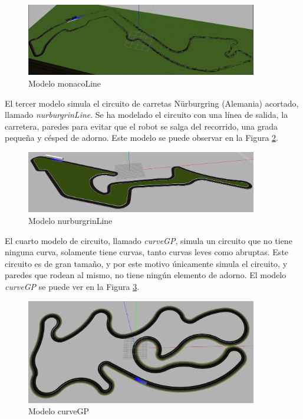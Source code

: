 \begin{figure}
  \begin{center}
    \includegraphics[width=0.9\textwidth]{figures/Infraestructura/circuit_Monaco.png}
		\caption{Modelo monacoLine}
		\label{fig.monaco}
		\end{center}
\end{figure}

El tercer modelo simula el circuito de carretas Nürburgring (Alemania) acortado, llamado \textit{nurburgrinLine}. Se ha modelado el circuito con una línea de salida, la carretera, paredes para evitar que el robot se salga del recorrido, una grada pequeña y césped de adorno. Este modelo se puede observar en la Figura \ref{fig.nurburgrin}.\\

\begin{figure}
  \begin{center}
    \includegraphics[width=0.9\textwidth]{figures/Infraestructura/circuit_Nurburgrin.png}
		\caption{Modelo nurburgrinLine}
		\label{fig.nurburgrin}
		\end{center}
\end{figure}

El cuarto modelo de circuito, llamado \textit{curveGP}, simula un circuito que no tiene ninguna curva, solamente tiene curvas, tanto curvas leves como abruptas. Este circuito es de gran tamaño, y por este motivo únicamente simula el circuito, y paredes que rodean al mismo, no tiene ningún elemento de adorno. El modelo \textit{curveGP} se puede ver en la Figura \ref{fig.curveGP}.\\


\begin{figure}
  \begin{center}
    \includegraphics[width=0.9\textwidth]{figures/Infraestructura/circuit_CurveGP.png}
		\caption{Modelo curveGP}
		\label{fig.curveGP}
		\end{center}
\end{figure}


